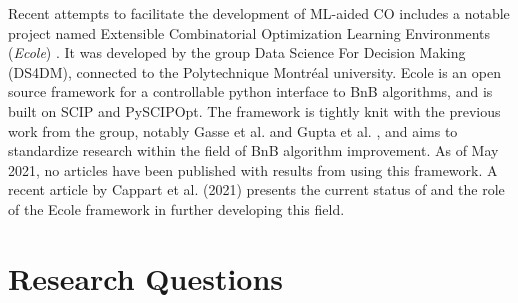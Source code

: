 Recent attempts to facilitate the development of \gls{ML}-aided \gls{CO} includes a notable project named Extensible Combinatorial Optimization Learning Environments (\emph{Ecole}) \cite{prouvost2020ecole}. It was developed by the group Data Science For Decision Making (\gls{DS4DM}), connected to the Polytechnique Montr\'{e}al university. \gls{Ecole} is an open source framework for a controllable python interface to \gls{BnB} algorithms, and is built on SCIP and PySCIPOpt. The framework is tightly knit with the previous work from the group, notably Gasse et al. \cite{gasse2019exact} and Gupta et al. \cite{gupta2020hybrid}, and aims to standardize research within the field of \gls{BnB} algorithm improvement.  
As of May 2021, no articles have been published with results from using this framework. A recent article by
Cappart et al. (2021) \cite{cappart2021combinatorial} presents the current status of and the role of the Ecole framework in further developing this field. 


\section{Research Questions}\label{sec:questions}

